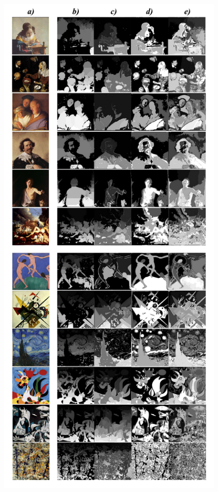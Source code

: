 \begin{figure}[ht!]
\begin{center}
        \includegraphics[scale=.3]{figs/expsegs}
        \fonteminha
\end{center}
\end{figure}

